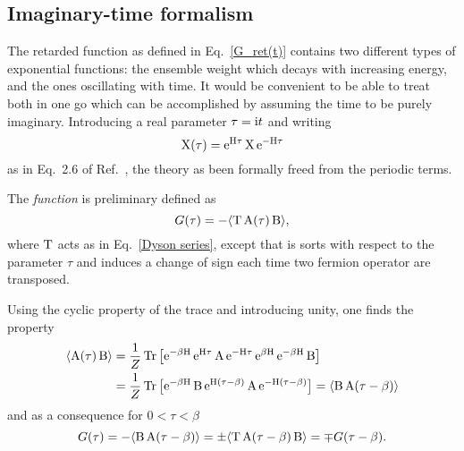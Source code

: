 \subsection{Imaginary-time formalism}

The retarded  function as defined in Eq.~\ref{G_ret(t)} contains two
different types of exponential functions: the ensemble weight which decays with
increasing energy, and the ones oscillating with time. It would be convenient to
be able to treat both in one go which can be accomplished by assuming the time
to be purely imaginary. Introducing a real parameter $\tau = \mathrm i t$ and writing
%
\begin{equation*}
    \mathrm X(\tau) = \mathrm e^{\mathrm H \tau} \, \mathrm X \, \mathrm e^{-\mathrm H \tau}
\end{equation*}
%
as in Eq.~2.6 of Ref.~, the theory as been formally freed
from the periodic terms.

The \emph{ function} is preliminary defined as
%
\begin{equation*}
    G(\tau) = -\langle\mathrm T \, \mathrm A(\tau) \, \mathrm B\rangle,
\end{equation*}
%
where $\mathrm T$ acts as in Eq.~\ref{Dyson series}, except that is sorts with
respect to the parameter $\tau$ and induces a change of sign each time two
fermion operator are transposed.

Using the cyclic property of the trace and introducing unity, one finds the
property
%
\begin{align*}
    \langle\mathrm A(\tau) \, \mathrm B\rangle &= \frac 1 Z \operatorname{Tr} \big[ \mathrm e^{-\beta \mathrm H} \,
    \mathrm e^{\mathrm H \tau} \, \mathrm A \, \mathrm e^{-\mathrm H \tau} \,
    \mathrm e^{\beta \mathrm H} \, \mathrm e^{-\beta \mathrm H} \, \mathrm B \big]
    \\
    &= \frac 1 Z \operatorname{Tr} \big[ \mathrm e^{-\beta \mathrm H} \, \mathrm B \,
    \mathrm e^{\mathrm H (\tau - \beta)} \, \mathrm A \, \mathrm e^{-\mathrm H (\tau - \beta)} \big]
    = \langle\mathrm B \, \mathrm A(\tau - \beta)\rangle
\end{align*}
%
and as a consequence for $0 < \tau < \beta$
%
\begin{equation} \label{(anti-) periodicity}
    G(\tau)
    = -\langle\mathrm B \, \mathrm A(\tau - \beta)\rangle
    = \pm \langle\mathrm T \, \mathrm A(\tau - \beta) \, \mathrm B\rangle
    = \mp G(\tau - \beta).
\end{equation}

